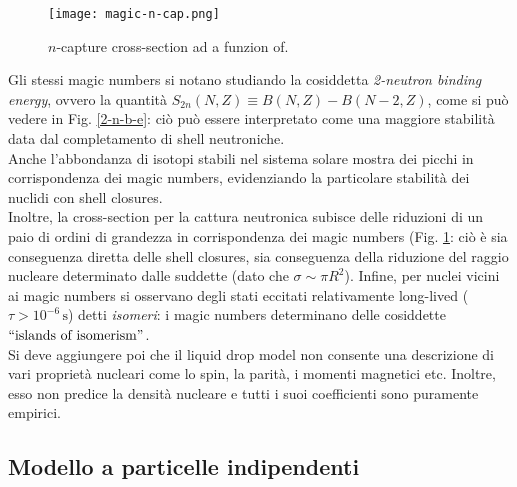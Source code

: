 \begin{figure}[!t]
	\centering
	\texttt{[image: magic-n-cap.png]}
	\caption{$ n $-capture cross-section ad a funzion of.}
	\label{n-cap-cr}
\end{figure}

Gli stessi magic numbers si notano studiando la cosiddetta \textit{2-neutron binding energy}, ovvero la quantità $ S_{2n}(N,Z) \equiv B(N,Z) - B(N-2,Z) $, come si può vedere in Fig. \ref{2-n-b-e}: ciò può essere interpretato come una maggiore stabilità data dal completamento di shell neutroniche.\\
Anche l'abbondanza di isotopi stabili nel sistema solare mostra dei picchi in corrispondenza dei magic numbers, evidenziando la particolare stabilità dei nuclidi con shell closures.\\
Inoltre, la cross-section per la cattura neutronica subisce delle riduzioni di un paio di ordini di grandezza in corrispondenza dei magic numbers (Fig. \ref{n-cap-cr}: ciò è sia conseguenza diretta delle shell closures, sia conseguenza della riduzione del raggio nucleare determinato dalle suddette (dato che $ \sigma \sim \pi R^2 $).
Infine, per nuclei vicini ai magic numbers si osservano degli stati eccitati relativamente long-lived ($ \tau > 10^{-6}\,\text{s} $) detti \textit{isomeri}: i magic numbers determinano delle cosiddette $ ``\text{islands of isomerism}" $.\\
Si deve aggiungere poi che il liquid drop model non consente una descrizione di vari proprietà nucleari come lo spin, la parità, i momenti magnetici etc. Inoltre, esso non predice la densità nucleare e tutti i suoi coefficienti sono puramente empirici.

\subsection{Modello a particelle indipendenti}

